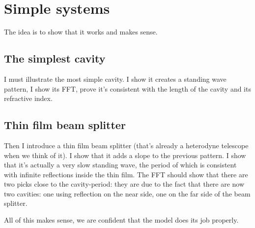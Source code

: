 
\section{Simple systems}

The idea is to show that it works and makes sense.

\subsection{The simplest cavity}
I must illustrate the most simple cavity.  I show it creates a standing wave pattern, I show its FFT, prove it's consistent with the length of the cavity and its refractive index.

\subsection{Thin film beam splitter}
Then I introduce a thin film beam splitter (that's already a heterodyne telescope when we think of it).  I show that it adds a slope to the previous pattern.  I show that it's actually a very slow standing wave, the period of which is consistent with infinite reflections inside the thin film.  The FFT should show that there are two picks close to the cavity-period: they are due to the fact that there are now two cavities: one using reflection on the near side, one on the far side of the beam splitter.

All of this makes sense, we are confident that the model does its job properly.
